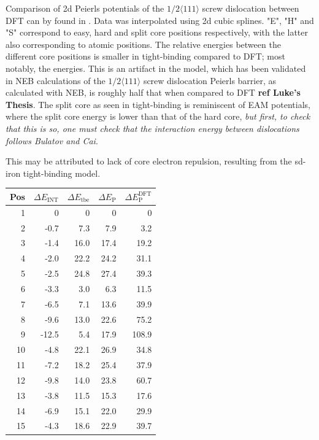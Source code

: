 \documentclass[a4paper]{article}
\begin{document}
Comparison of 2d Peierls potentials of the \(1/2\langle 111 \rangle\) screw dislocation between
DFT can by found in \cite{Itakura2012}. Data was interpolated using 2d cubic splines. "E", "H"
and "S" correspond to easy, hard and split core positions respectively, with the latter also
corresponding to atomic positions. The relative energies between the different core
positions is smaller in tight-binding compared to DFT; most notably, the energies. This is
an artifact in the model, which has been validated in NEB calculations of the \(1/2\langle
	111\rangle\) screw dislocation Peierls barrier, as calculated with NEB, is roughly half that
when compared to DFT \textbf{ref Luke's Thesis}. The split core as seen in
tight-binding is reminiscent of EAM potentials, where the split core energy is lower than
that of the hard core, \emph{but first, to check that this is so, one must check that
the interaction energy between dislocations follows Bulatov and Cai}.

This may be attributed to lack of core electron	repulsion, resulting from the sd-iron tight-binding model. 

\begin{center}
\begin{tabular}{rrrrr}
Pos & \(\Delta E_{\text{INT}}\) & \(\Delta E_{\text{tbe}}\) & \(\Delta E_{\text{P}}\) & \(\Delta E_{\text{P}}^{\text{DFT}}\)\\
\hline
1 & 0 & 0 & 0 & 0\\
2 & -0.7 & 7.3 & 7.9 & 3.2\\
3 & -1.4 & 16.0 & 17.4 & 19.2\\
4 & -2.0 & 22.2 & 24.2 & 31.1\\
5 & -2.5 & 24.8 & 27.4 & 39.3\\
6 & -3.3 & 3.0 & 6.3 & 11.5\\
7 & -6.5 & 7.1 & 13.6 & 39.9\\
8 & -9.6 & 13.0 & 22.6 & 75.2\\
9 & -12.5 & 5.4 & 17.9 & 108.9\\
10 & -4.8 & 22.1 & 26.9 & 34.8\\
11 & -7.2 & 18.2 & 25.4 & 37.9\\
12 & -9.8 & 14.0 & 23.8 & 60.7\\
13 & -3.8 & 11.5 & 15.3 & 17.6\\
14 & -6.9 & 15.1 & 22.0 & 29.9\\
15 & -4.3 & 18.6 & 22.9 & 39.7\\
\end{tabular}
\end{center}
\end{document}
